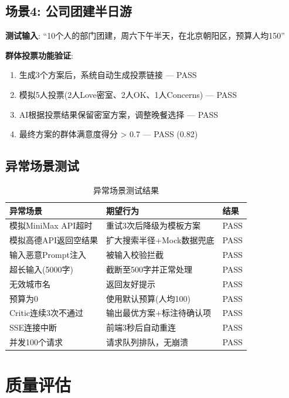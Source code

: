 \documentclass[12pt,a4paper]{ctexart}
\begin{document}
\subsection{场景4: 公司团建半日游}

\textbf{测试输入}: ``10个人的部门团建，周六下午半天，在北京朝阳区，预算人均150''

\textbf{群体投票功能验证}:
\begin{enumerate}
\item 生成3个方案后，系统自动生成投票链接 --- PASS
\item 模拟5人投票(2人Love密室、2人OK、1人Concerns) --- PASS
\item AI根据投票结果保留密室方案，调整晚餐选择 --- PASS
\item 最终方案的群体满意度得分 > 0.7 --- PASS (0.82)
\end{enumerate}

\subsection{异常场景测试}

\begin{table}[H]
\centering
\caption{异常场景测试结果}
\label{tab:exception-test}
\renewcommand{\arraystretch}{1.3}
\begin{tabularx}{\textwidth}{>{\raggedright}p{3.5cm}Xl}
\toprule
\textbf{异常场景} & \textbf{期望行为} & \textbf{结果} \\
\midrule
模拟MiniMax API超时 & 重试3次后降级为模板方案 & PASS \\
模拟高德API返回空结果 & 扩大搜索半径+Mock数据兜底 & PASS \\
输入恶意Prompt注入 & 被输入校验拦截 & PASS \\
超长输入(5000字) & 截断至500字并正常处理 & PASS \\
无效城市名 & 返回友好提示 & PASS \\
预算为0 & 使用默认预算(人均100) & PASS \\
Critic连续3次不通过 & 输出最优方案+标注待确认项 & PASS \\
SSE连接中断 & 前端3秒后自动重连 & PASS \\
并发100个请求 & 请求队列排队，无崩溃 & PASS \\
\bottomrule
\end{tabularx}
\end{table}

\section{质量评估}
\end{document}
